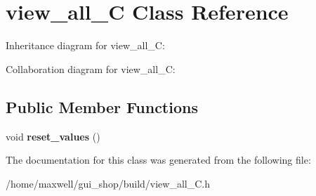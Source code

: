 \hypertarget{classview__all__C}{}\section{view\+\_\+all\+\_\+C Class Reference}
\label{classview__all__C}


Inheritance diagram for view\+\_\+all\+\_\+C\+:


Collaboration diagram for view\+\_\+all\+\_\+C\+:
\subsection*{Public Member Functions}
\begin{DoxyCompactItemize}
\item 
void {\bfseries reset\+\_\+values} ()\hypertarget{classview__all__C_abe41a3bdeb4e14d8a4a5b270d4e693ca}{}\label{classview__all__C_abe41a3bdeb4e14d8a4a5b270d4e693ca}

\end{DoxyCompactItemize}


The documentation for this class was generated from the following file\+:\begin{DoxyCompactItemize}
\item 
/home/maxwell/gui\+\_\+shop/build/view\+\_\+all\+\_\+\+C.\+h\end{DoxyCompactItemize}
